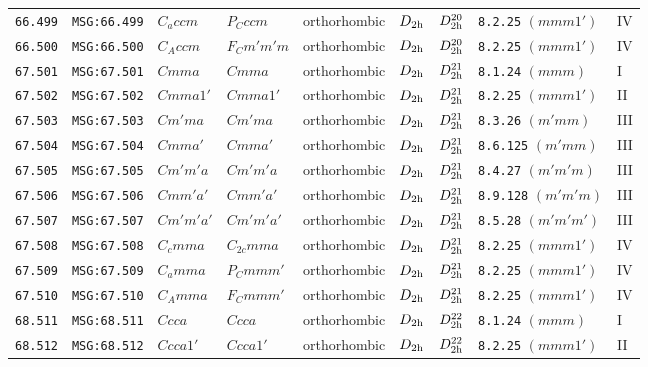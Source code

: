\documentclass[fleqn,10pt]{jsarticle}
\begin{document}
\begin{center}
\begin{longtable}{lllllllll}
\texttt{66.499} & \texttt{MSG:66.499} & $C_{a}ccm$ & $P_{C}ccm$ & orthorhombic & $D_{\rm 2h}$ & $D_{\rm 2h}^{20}$ & \texttt{8.2.25} $(mmm1')$ & IV \\
\texttt{66.500} & \texttt{MSG:66.500} & $C_{A}ccm$ & $F_{C}m'm'm$ & orthorhombic & $D_{\rm 2h}$ & $D_{\rm 2h}^{20}$ & \texttt{8.2.25} $(mmm1')$ & IV \\ \hline
\texttt{67.501} & \texttt{MSG:67.501} & $Cmma$ & $Cmma$ & orthorhombic & $D_{\rm 2h}$ & $D_{\rm 2h}^{21}$ & \texttt{8.1.24} $(mmm)$ & I \\
\texttt{67.502} & \texttt{MSG:67.502} & $Cmma1'$ & $Cmma1'$ & orthorhombic & $D_{\rm 2h}$ & $D_{\rm 2h}^{21}$ & \texttt{8.2.25} $(mmm1')$ & II \\
\texttt{67.503} & \texttt{MSG:67.503} & $Cm'ma$ & $Cm'ma$ & orthorhombic & $D_{\rm 2h}$ & $D_{\rm 2h}^{21}$ & \texttt{8.3.26} $(m'mm)$ & III \\
\texttt{67.504} & \texttt{MSG:67.504} & $Cmma'$ & $Cmma'$ & orthorhombic & $D_{\rm 2h}$ & $D_{\rm 2h}^{21}$ & \texttt{8.6.125} $(m'mm)$ & III \\
\texttt{67.505} & \texttt{MSG:67.505} & $Cm'm'a$ & $Cm'm'a$ & orthorhombic & $D_{\rm 2h}$ & $D_{\rm 2h}^{21}$ & \texttt{8.4.27} $(m'm'm)$ & III \\
\texttt{67.506} & \texttt{MSG:67.506} & $Cmm'a'$ & $Cmm'a'$ & orthorhombic & $D_{\rm 2h}$ & $D_{\rm 2h}^{21}$ & \texttt{8.9.128} $(m'm'm)$ & III \\
\texttt{67.507} & \texttt{MSG:67.507} & $Cm'm'a'$ & $Cm'm'a'$ & orthorhombic & $D_{\rm 2h}$ & $D_{\rm 2h}^{21}$ & \texttt{8.5.28} $(m'm'm')$ & III \\
\texttt{67.508} & \texttt{MSG:67.508} & $C_{c}mma$ & $C_{2c}mma$ & orthorhombic & $D_{\rm 2h}$ & $D_{\rm 2h}^{21}$ & \texttt{8.2.25} $(mmm1')$ & IV \\
\texttt{67.509} & \texttt{MSG:67.509} & $C_{a}mma$ & $P_{C}mmm'$ & orthorhombic & $D_{\rm 2h}$ & $D_{\rm 2h}^{21}$ & \texttt{8.2.25} $(mmm1')$ & IV \\
\texttt{67.510} & \texttt{MSG:67.510} & $C_{A}mma$ & $F_{C}mmm'$ & orthorhombic & $D_{\rm 2h}$ & $D_{\rm 2h}^{21}$ & \texttt{8.2.25} $(mmm1')$ & IV \\ \hline
\texttt{68.511} & \texttt{MSG:68.511} & $Ccca$ & $Ccca$ & orthorhombic & $D_{\rm 2h}$ & $D_{\rm 2h}^{22}$ & \texttt{8.1.24} $(mmm)$ & I \\
\texttt{68.512} & \texttt{MSG:68.512} & $Ccca1'$ & $Ccca1'$ & orthorhombic & $D_{\rm 2h}$ & $D_{\rm 2h}^{22}$ & \texttt{8.2.25} $(mmm1')$ & II \\

\end{longtable}
\end{center}
\end{document}
